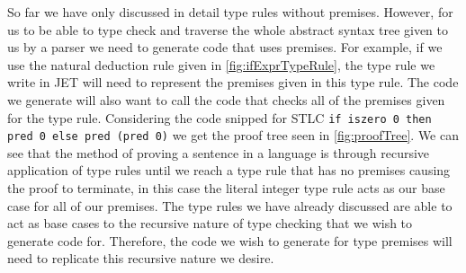 So far we have only discussed in detail type rules without premises.
However, for us to be able to type check and traverse the whole abstract syntax tree given to us by a parser we need to generate code that uses premises.
For example, if we use the natural deduction rule given in \autoref{fig:ifExprTypeRule}, the type rule we write in JET will need to represent the premises given in this type rule.
The code we generate will also want to call the code that checks all of the premises given for the type rule.
Considering the code snipped for STLC \texttt{if iszero 0 then pred 0 else pred (pred 0)} we get the proof tree seen in \autoref{fig:proofTree}.
We can see that the method of proving a sentence in a language is through recursive application of type rules until we reach a type rule that has no premises causing the proof to terminate, in this case the literal integer type rule acts as our base case for all of our premises.
The type rules we have already discussed are able to act as base cases to the recursive nature of type checking that we wish to generate code for.
Therefore, the code we wish to generate for type premises will need to replicate this recursive nature we desire.

